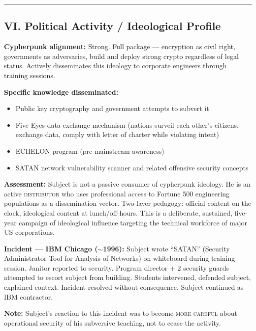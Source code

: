 \vspace{1cm}\hrule\vspace{1cm}

\subsection*{VI. Political Activity / Ideological Profile}
\label{interlude:political-activity-ideological-profile}

\textbf{Cypherpunk alignment:} Strong. Full package --- encryption as civil right, governments as adversaries, build and deploy strong crypto regardless of legal status. Actively disseminates this ideology to corporate engineers through training sessions.

\textbf{Specific knowledge disseminated:}

\begin{itemize}[nosep]
\item Public key cryptography and government attempts to subvert it
\item Five Eyes data exchange mechanism (nations surveil each other's citizens, exchange data, comply with letter of charter while violating intent)
\item ECHELON program (pre-mainstream awareness)
\item SATAN network vulnerability scanner and related offensive security concepts
\end{itemize}

\textbf{Assessment:} Subject is not a passive consumer of cypherpunk ideology. He is an active \textsc{distributor} who uses professional access to Fortune 500 engineering populations as a dissemination vector. Two-layer pedagogy: official content on the clock, ideological content at lunch/off-hours. This is a deliberate, sustained, five-year campaign of ideological influence targeting the technical workforce of major US corporations.

\textbf{Incident --- IBM Chicago ($\sim$1996):} Subject wrote ``SATAN'' (Security Administrator Tool for Analysis of Networks) on whiteboard during training session. Janitor reported to security. Program director + 2 security guards attempted to escort subject from building. Students intervened, defended subject, explained context. Incident resolved without consequence. Subject continued as IBM contractor.

\textbf{Note:} Subject's reaction to this incident was to become \textsc{more careful} about operational security of his subversive teaching, not to cease the activity.

